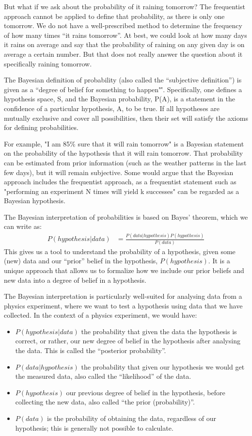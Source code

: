 But what if we ask about the probability of it raining tomorrow? The frequentist approach cannot be applied to define that probability, as there is only one tomorrow. We do not have a well-prescribed method to determine the frequency of how many times ``it rains tomorrow''. At best, we could look at how many days it rains on average and say that the probability of raining on any given day is on average a certain number. But that does not really answer the question about it specifically raining tomorrow. 

The Bayesian definition of probability (also called the ``subjective definition'') is given as a ``degree of belief for something to happen"\''. Specifically, one defines a hypothesis space, S,  and the Bayesian probability, P(A),  is a statement in the confidence of a particular hypothesis, A, to be true. If all hypotheses are mutually exclusive and cover all possibilities, then their set will satisfy the axioms for defining probabilities.

For example, "I am 85\% sure that it will rain tomorrow" is a Bayesian statement on the probability of the  hypothesis that it will rain tomorrow. That probability can be estimated from prior information (such as the weather patterns in the last few days), but it will remain subjective. Some would argue that the Bayesian approach includes the frequentist approach, as a frequentist statement such as "performing an experiment N times will yield k successes" can be regarded as a Bayesian hypothesis. 

The Bayesian interpretation of probabilities is based on Bayes' theorem, which we can write as:
\begin{align*}
P(hypothesis|data) &= \frac{P(data | hypothesis)P(hypothesis)}{P(data)}
\end{align*}
This gives us a tool to understand the probability of a hypothesis, given some (new) data and our ``prior'' belief in the hypothesis, $P(hypothesis)$. It is a unique approach that allows us to formalize how we include our prior beliefs and new data into a degree of belief in a hypothesis.

The Bayesian interpretation is particularly well-suited for analysing data from a physics experiment, where we want to test a hypothesis using data that we have collected. In the context of a physics experiment, we would have:
\begin{itemize}
\item $P(hypothesis | data)$ the probability that given the data the hypothesis is correct, or rather, our new degree of belief in the hypothesis after analysing the data. This is called the ``posterior probability''.
\item $P(data|hypothesis)$ the probability that given our hypothesis we would get the measured data, also called the ``likelihood'' of the data.
\item $P(hypothesis)$ our previous degree of belief in the hypothesis, before collecting the new data, also called ``the prior (probability)''.
\item $P(data)$ is the probability of obtaining the data, regardless of our hypothesis; this is generally not possible to calculate.
\end{itemize}

